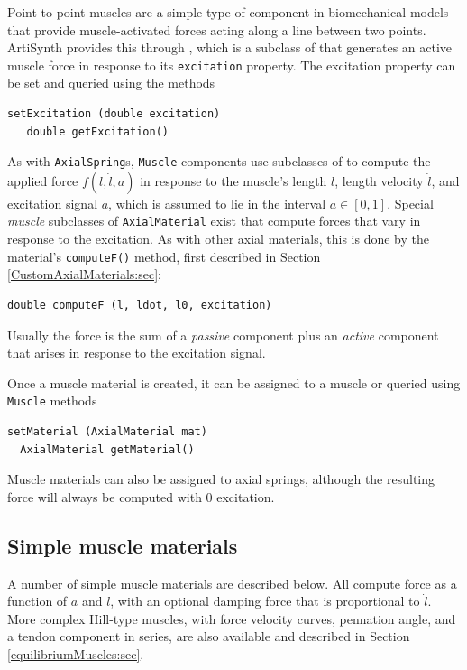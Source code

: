 Point-to-point muscles are a simple type of component in biomechanical
models that provide muscle-activated forces acting along a line
between two points. ArtiSynth provides this through
, which is a subclass of
 that generates an
active muscle force in response to its {\tt excitation} property. The
excitation property can be set and queried using the methods
\begin{lstlisting}[]
   setExcitation (double excitation)
   double getExcitation()
\end{lstlisting}
%

As with {\tt AxialSpring}s, {\tt Muscle} components use subclasses of
 to compute the
applied force $f (l, \dot l, a)$ in response to the muscle's length
$l$, length velocity $\dot l$, and excitation signal $a$, which is
assumed to lie in the interval $a \in [0,1]$. Special {\it muscle}
subclasses of {\tt AxialMaterial} exist that compute forces that vary
in response to the excitation. As with other axial materials, this is
done by the material's {\tt computeF()} method, first described in
Section \ref{CustomAxialMaterials:sec}:
%
\begin{lstlisting}[]
  double computeF (l, ldot, l0, excitation)
\end{lstlisting}
%
Usually the force is the sum of a {\it passive} component plus an {\it
active} component that arises in response to the excitation signal.

Once a muscle material is created, it can be assigned to a muscle
or queried using {\tt Muscle} methods
\begin{lstlisting}[]
  setMaterial (AxialMaterial mat)
  AxialMaterial getMaterial()
\end{lstlisting}
%

\begin{sideblock}
Muscle materials can also be assigned to axial springs, although the
resulting force will always be computed with 0 excitation.
\end{sideblock}

\subsection{Simple muscle materials}
\label{sec:mechii:musclematerials}

A number of simple muscle materials are described below. All compute
force as a function of $a$ and $l$, with an optional damping force
that is proportional to $\dot l$. More complex Hill-type muscles, with
force velocity curves, pennation angle, and a tendon component in
series, are also available and described in
Section \ref{equilibriumMuscles:sec}.

